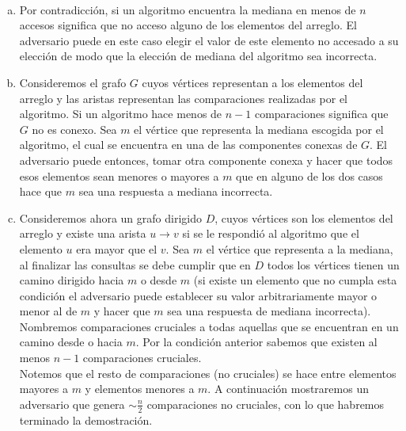\documentclass[dcc,uchile]{fcfmcourse}
\theoremstyle{plain}
\theoremstyle{definition}
\begin{document}
\newpage
\begin{problems}
\\
\begin{enumerate}[a)]
    \item Por contradicción, si un algoritmo encuentra la mediana en menos de $n$ accesos significa que no acceso alguno de los elementos del arreglo. El adversario puede en este caso elegir el valor de este elemento no accesado a su elección de modo que la elección de mediana del algoritmo sea incorrecta.
    
    \item Consideremos el grafo $G$ cuyos vértices representan a los elementos del arreglo y las aristas representan las comparaciones realizadas por el algoritmo. Si un algoritmo hace menos de $n-1$ comparaciones significa que $G$ no es conexo. Sea $m$ el vértice que representa la mediana escogida por el algoritmo, el cual se encuentra en una de las componentes conexas de $G$. El adversario puede entonces, tomar otra componente conexa y hacer que todos esos elementos sean menores o mayores a $m$ que en alguno de los dos casos hace que $m$ sea una respuesta a mediana incorrecta.
    
    \item Consideremos ahora un grafo dirigido $D$, cuyos vértices son los elementos del arreglo y existe una arista $u \to v$ si se le respondió al algoritmo que el elemento $u$ era mayor que el $v$. Sea $m$ el vértice que representa a la mediana, al finalizar las consultas se debe cumplir que en $D$ todos los vértices tienen un camino dirigido hacia $m$ o desde $m$ (si existe un elemento que no cumpla esta condición el adversario puede establecer su valor arbitrariamente mayor o menor al de $m$ y hacer que $m$ sea una respuesta de mediana incorrecta). Nombremos comparaciones cruciales a todas aquellas que se encuentran en un camino desde o hacia $m$. Por la condición anterior sabemos que existen al menos $n-1$ comparaciones cruciales.\\
    
    Notemos que el resto de comparaciones (no cruciales) se hace entre elementos mayores a $m$ y elementos menores a $m$. A continuación mostraremos un adversario que genera $\sim \frac{n}{2}$ comparaciones no cruciales, con lo que habremos terminado la demostración.\\
    

\end{enumerate}
\end{problems}
\end{document}
